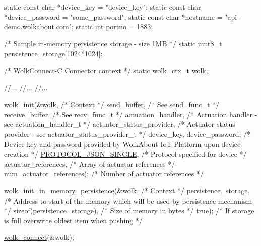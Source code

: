 \begin{DoxyCode}
\textcolor{keyword}{static} \textcolor{keyword}{const} \textcolor{keywordtype}{char} *device\_key = \textcolor{stringliteral}{"device\_key"};
\textcolor{keyword}{static} \textcolor{keyword}{const} \textcolor{keywordtype}{char} *device\_password = \textcolor{stringliteral}{"some\_password"};
\textcolor{keyword}{static} \textcolor{keyword}{const} \textcolor{keywordtype}{char} *hostname = \textcolor{stringliteral}{"api-demo.wolkabout.com"};
\textcolor{keyword}{static} \textcolor{keywordtype}{int} portno = 1883;

\textcolor{comment}{/* Sample in-memory persistence storage - size 1MB */}
\textcolor{keyword}{static} uint8\_t persistence\_storage[1024*1024];

\textcolor{comment}{/* WolkConnect-C Connector context */}
\textcolor{keyword}{static} \hyperlink{structwolk__ctx}{wolk\_ctx\_t} wolk;

\textcolor{comment}{//...}
\textcolor{comment}{//...}
\textcolor{comment}{//...}

\hyperlink{wolk__connector_8h_a607b5439ae7741284a73312b7794fa7a}{wolk\_init}(&wolk,                                             \textcolor{comment}{/* Context */}
          send\_buffer,                                       \textcolor{comment}{/* See send\_func\_t */}
          receive\_buffer,                                    \textcolor{comment}{/* See recv\_func\_t */}
          actuation\_handler,                                 \textcolor{comment}{/* Actuation handler        - see
       actuation\_handler\_t */}
          actuator\_status\_provider,                          \textcolor{comment}{/* Actuator status provider - see
       actuator\_status\_provider\_t */}
          device\_key, device\_password,                       \textcolor{comment}{/* Device key and password provided by
       WolkAbout IoT Platform upon device creation */}
          \hyperlink{wolk__connector_8h_a91e19fa4fff461493e1a41f7c7aa4e5fa9574b7cae2523f47c59e082e473223bd}{PROTOCOL\_JSON\_SINGLE},                              \textcolor{comment}{/* Protocol specified for
       device */}
          actuator\_references,                               \textcolor{comment}{/* Array of actuator references */}
          num\_actuator\_references);                          \textcolor{comment}{/* Number of actuator references */}

\hyperlink{wolk__connector_8h_a0fbb983c6b65072501b078ba6ff8e5ad}{wolk\_init\_in\_memory\_persistence}(&wolk,                       \textcolor{comment}{/* Context */}
                                persistence\_storage,         \textcolor{comment}{/* Address to start of the memory which will
       be used by persistence mechanism */}
                                \textcolor{keyword}{sizeof}(persistence\_storage), \textcolor{comment}{/* Size of memory in bytes */}
                                \textcolor{keyword}{true});                       \textcolor{comment}{/* If storage is full overwrite oldest item
       when pushing */}

\hyperlink{wolk__connector_8h_ab246fad03ad57f3efe89f4ec2c93a288}{wolk\_connect}(&wolk);
\end{DoxyCode}
